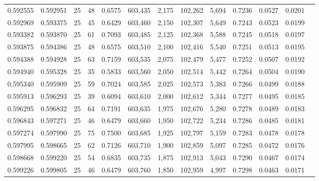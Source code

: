 \begin{tabular}{rrrrrrrrrrrrr}
0.592555 & 0.592951 &    25 &  48 &                                     0.6575 & 603,435 &   2,175 & 102,262 &   5,694 & 0.7236 & 0.0527 & 0.0201 \\
0.592969 & 0.593375 &    25 &  45 &                                     0.6429 & 603,460 &   2,150 & 102,307 &   5,649 & 0.7243 & 0.0523 & 0.0199 \\
0.593382 & 0.593870 &    25 &  61 &                                     0.7093 & 603,485 &   2,125 & 102,368 &   5,588 & 0.7245 & 0.0518 & 0.0197 \\
0.593875 & 0.594386 &    25 &  48 &                                     0.6575 & 603,510 &   2,100 & 102,416 &   5,540 & 0.7251 & 0.0513 & 0.0195 \\
0.594388 & 0.594928 &    25 &  63 &                                     0.7159 & 603,535 &   2,075 & 102,479 &   5,477 & 0.7252 & 0.0507 & 0.0192 \\
0.594940 & 0.595328 &    25 &  35 &                                     0.5833 & 603,560 &   2,050 & 102,514 &   5,442 & 0.7264 & 0.0504 & 0.0190 \\
0.595340 & 0.595909 &    25 &  59 &                                     0.7024 & 603,585 &   2,025 & 102,573 &   5,383 & 0.7266 & 0.0499 & 0.0188 \\
0.595913 & 0.596293 &    25 &  39 &                                     0.6094 & 603,610 &   2,000 & 102,612 &   5,344 & 0.7277 & 0.0495 & 0.0185 \\
0.596295 & 0.596832 &    25 &  64 &                                     0.7191 & 603,635 &   1,975 & 102,676 &   5,280 & 0.7278 & 0.0489 & 0.0183 \\
0.596843 & 0.597271 &    25 &  46 &                                     0.6479 & 603,660 &   1,950 & 102,722 &   5,234 & 0.7286 & 0.0485 & 0.0181 \\
0.597274 & 0.597990 &    25 &  75 &                                     0.7500 & 603,685 &   1,925 & 102,797 &   5,159 & 0.7283 & 0.0478 & 0.0178 \\
0.597995 & 0.598665 &    25 &  62 &                                     0.7126 & 603,710 &   1,900 & 102,859 &   5,097 & 0.7285 & 0.0472 & 0.0176 \\
0.598668 & 0.599220 &    25 &  54 &                                     0.6835 & 603,735 &   1,875 & 102,913 &   5,043 & 0.7290 & 0.0467 & 0.0174 \\
0.599226 & 0.599805 &    25 &  46 &                                     0.6479 & 603,760 &   1,850 & 102,959 &   4,997 & 0.7298 & 0.0463 & 0.0171 \\

\end{tabular}
